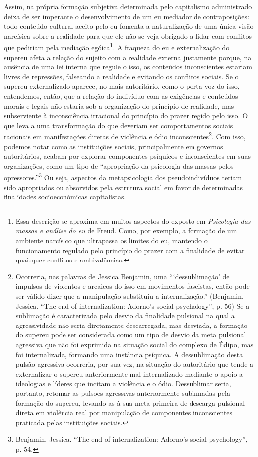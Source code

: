 Assim, na própria formação subjetiva determinada pelo capitalismo
administrado deixa de ser imperante o desenvolvimento de um eu mediador
de contraposições: todo conteúdo cultural aceito pelo eu fomenta a
naturalização de uma única visão narcísica sobre a realidade para que
ele não se veja obrigado a lidar com conflitos que pediriam pela
mediação egóica\footnote{Essa descrição se aproxima em muitos aspectos
  do exposto em \emph{Psicologia das massas e análise do eu} de Freud.
  Como, por exemplo, a formação de um ambiente narcísico que ultrapassa
  os limites do eu, mantendo o funcionamento regulado pelo princípio do
  prazer com a finalidade de evitar quaisquer conflitos e ambivalências.}.
A fraqueza do eu e externalização do supereu afeta a relação do sujeito
com a realidade externa justamente porque, na ausência de uma lei
interna que regule o isso, os conteúdos inconscientes estariam livres de
repressões, falseando a realidade e evitando os conflitos sociais. Se o
supereu externalizado aparece, no mais autoritário, como o porta-voz do
isso, entendemos, então, que a relação do indivíduo com as exigências e
conteúdos morais e legais não estaria sob a organização do princípio de
realidade, mas subserviente à inconsciência irracional do princípio do
prazer regido pelo isso. O que leva a uma transformação do que deveriam
ser comportamentos sociais racionais em manifestações diretas de
violência e ódio inconscientes\footnote{Ocorreria, nas palavras de
  Jessica Benjamin, uma ```dessublimação' de impulsos de violentos e
  arcaicos do isso em movimentos fascistas, então pode ser válido dizer
  que a manipulação substituiu a internalização.'' (Benjamin, Jessica.
  ``The end of internalization: Adorno's social psychology'', p. 56) Se
  a sublimação é caracterizada pelo desvio da finalidade pulsional na
  qual a agressividade não seria diretamente descarregada, mas desviada,
  a formação do supereu pode ser considerada como um tipo de desvio da
  meta pulsional agressiva que não foi exprimida na situação social do
  complexo de Édipo, mas foi internalizada, formando uma instância
  psíquica. A dessublimação desta pulsão agressiva ocorreria, por sua
  vez, na situação do autoritário que tende a externalizar o supereu
  anteriormente mal internalizado mediante o apoio a ideologias e
  líderes que incitam a violência e o ódio. Dessublimar seria, portanto,
  retomar as pulsões agressivas anteriormente sublimadas pela formação
  do supereu, levando-as à sua meta primeira de descarga pulsional
  direta em violência real por manipulação de componentes inconscientes
  praticada pelas instituições sociais.}. Com isso, podemos notar como
as instituições sociais, principalmente em governos autoritários, acabam
por explorar componentes psíquicos e inconscientes em suas organizações,
como um tipo de ``apropriação da psicologia das massas pelos
opressores.''\footnote{Benjamin, Jessica. ``The end of internalization:
  Adorno's social psychology'', p. 54.} Ou seja, aspectos da
metapsicologia dos pseudoindivíduos teriam sido apropriados ou
absorvidos pela estrutura social em favor de determinadas finalidades
socioeconômicas capitalistas.

